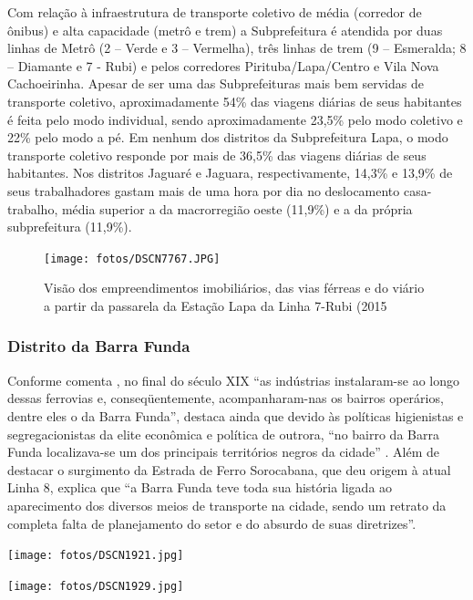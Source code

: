 	\begin{citacao}
		Com relação à infraestrutura de transporte coletivo de média (corredor de ônibus) e alta capacidade (metrô e trem) a Subprefeitura é atendida por duas linhas de Metrô (2 – Verde e 3 – Vermelha), três linhas de trem (9 – Esmeralda; 8 – Diamante e 7 - Rubi) e pelos corredores Pirituba/Lapa/Centro e Vila Nova Cachoeirinha. Apesar de ser uma das Subprefeituras mais bem servidas de transporte coletivo, aproximadamente 54\%   das viagens diárias de seus habitantes é feita pelo modo individual, sendo aproximadamente 23,5\%   pelo modo coletivo e 22\%   pelo modo a pé. Em nenhum dos distritos da Subprefeitura Lapa, o modo transporte coletivo responde por mais de 36,5\%   das viagens diárias de seus habitantes. Nos distritos Jaguaré e Jaguara, respectivamente, 14,3\%   e 13,9\%   de seus trabalhadores gastam mais de uma hora por dia no deslocamento casa-trabalho, média superior a da macrorregião oeste (11,9\%) e a da própria subprefeitura (11,9\%).
	\end{citacao}
	
	\begin{figure}[h]
		\caption{Visão dos empreendimentos imobiliários, das vias férreas e do viário a partir da passarela da Estação Lapa da Linha 7-Rubi (2015}
		\texttt{[image: fotos/DSCN7767.JPG]}
	\end{figure}	
	
	\subsubsection{Distrito da Barra Funda}
	
	Conforme comenta , no final do século XIX ``as indústrias instalaram-se ao longo dessas ferrovias e, conseqüentemente, acompanharam-nas os bairros operários, dentre eles o da Barra Funda'', destaca ainda que devido às políticas higienistas e segregacionistas da elite econômica e política de outrora, ``no bairro da Barra Funda localizava-se um dos principais	territórios negros da cidade'' \cite[pág. 19]{Brunelli}. Além de destacar o surgimento da Estrada de Ferro Sorocabana, que deu origem à atual Linha 8,  explica que ``a Barra Funda teve toda sua história ligada ao aparecimento dos diversos meios de transporte na cidade, sendo um retrato da completa falta de planejamento do setor e do absurdo de suas diretrizes''.
	
	\noindent
	\begin{minipage}[b]{.4\textwidth}
		\texttt{[image: fotos/DSCN1921.jpg]}
	\end{minipage}%
	\hfill
	\begin{minipage}[b]{.4\linewidth}
		\texttt{[image: fotos/DSCN1929.jpg]}
	\end{minipage}
	
